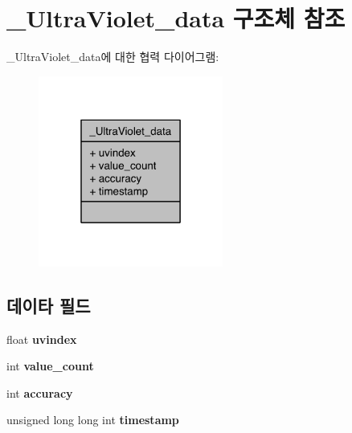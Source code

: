 \hypertarget{struct__UltraViolet__data}{\section{\-\_\-\-Ultra\-Violet\-\_\-data 구조체 참조}
\label{struct__UltraViolet__data}
}


\-\_\-\-Ultra\-Violet\-\_\-data에 대한 협력 다이어그램\-:\nopagebreak
\begin{figure}[H]
\begin{center}
\leavevmode
\includegraphics[width=172pt]{d8/d9e/struct__UltraViolet__data__coll__graph}
\end{center}
\end{figure}
\subsection*{데이타 필드}
\begin{DoxyCompactItemize}
\item 
\hypertarget{struct__UltraViolet__data_a46f441c4177376452cb467caa0b7fa46}{float {\bfseries uvindex}}\label{struct__UltraViolet__data_a46f441c4177376452cb467caa0b7fa46}

\item 
\hypertarget{struct__UltraViolet__data_a40a079bfc72408819dc78da308203a74}{int {\bfseries value\-\_\-count}}\label{struct__UltraViolet__data_a40a079bfc72408819dc78da308203a74}

\item 
\hypertarget{struct__UltraViolet__data_a5565cf9073275f9713f9016e7c10d25f}{int {\bfseries accuracy}}\label{struct__UltraViolet__data_a5565cf9073275f9713f9016e7c10d25f}

\item 
\hypertarget{struct__UltraViolet__data_a8de02c4128636a7bf630ff5428f60c8d}{unsigned long long int {\bfseries timestamp}}\label{struct__UltraViolet__data_a8de02c4128636a7bf630ff5428f60c8d}

\end{DoxyCompactItemize}


